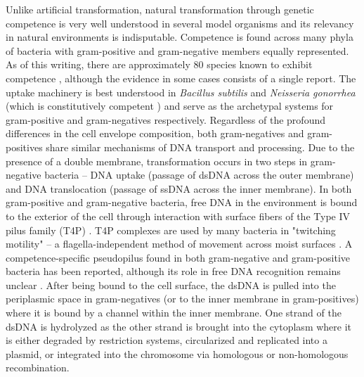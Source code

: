 Unlike artificial transformation, natural transformation through genetic
competence is very well understood in several model organisms and its relevancy
in natural environments is indisputable. Competence is found across many phyla
of bacteria with gram-positive and gram-negative members equally represented. As
of this writing, there are approximately 80 species known to exhibit
competence \cite{Johnston:2014dc}, although the evidence in some cases consists
of a single report.  The uptake machinery is best understood in \textit{Bacillus
subtilis} and \textit{Neisseria gonorrhea} (which is constitutively competent
\cite{Biswas:1982tl, Biswas:1989ui}) and serve as the archetypal systems
for gram-positive and gram-negatives respectively. Regardless of the profound
differences in the cell envelope composition, both gram-negatives and
gram-positives share similar mechanisms of DNA transport and processing. Due to
the presence of a double membrane, transformation occurs in two steps in
gram-negative bacteria -- DNA uptake (passage of dsDNA across the outer
membrane) and DNA translocation (passage of ssDNA across the inner membrane). In
both gram-positive and gram-negative bacteria, free DNA in the environment is
bound to the exterior of the cell through interaction with surface fibers of the
Type IV pilus family (T4P) \cite{Burton:2010ee}. T4P complexes are used by many
bacteria in "twitching motility" -- a flagella-independent method of movement
across moist surfaces \cite{Mattick:2002il}. A competence-specific pseudopilus
found in both gram-negative and gram-positive bacteria has been reported,
although its role in free DNA recognition remains
unclear \cite{Johnston:2014dc}. After being bound to the cell surface, the
dsDNA is pulled into the periplasmic space in gram-negatives (or to the inner
membrane in gram-positives) where it is bound by a channel within the inner
membrane. One strand of the dsDNA is hydrolyzed as the other strand is brought
into the cytoplasm where it is either degraded by restriction systems,
circularized and replicated into a plasmid, or integrated into the chromosome
via homologous or non-homologous recombination.


